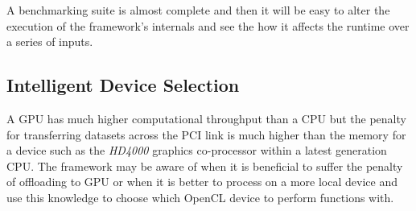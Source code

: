     A benchmarking suite is almost complete and then it will be easy to alter the execution of the framework's internals and see the how it affects the runtime over a series of inputs.

    \subsection{Intelligent Device Selection}
 A GPU has much higher computational throughput than a CPU but the penalty for transferring datasets across the PCI link is much higher than the memory for a device such as the \emph{HD4000} graphics co-processor within a latest generation CPU.
The framework may be aware of when it is beneficial to suffer the penalty of offloading to GPU or when it is better to process on a more local device and use this knowledge to choose which OpenCL device to perform functions with.
